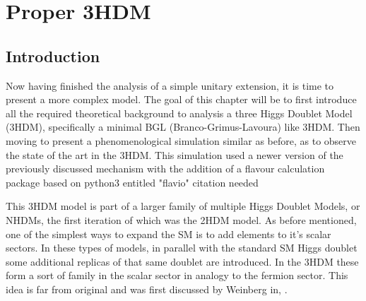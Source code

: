 
\newpage 

\chapter{Proper 3HDM }


%

\section{Introduction}

Now having finished the analysis of a simple unitary extension, it is time to present a more complex model. 
%
The goal of this chapter will be to first introduce all the required theoretical background to analysis a three Higgs Doublet Model (3HDM), specifically a minimal BGL (Branco-Grimus-Lavoura) like 3HDM. 
% 
Then moving to present a phenomenological simulation similar as before, as to observe the state of the art in the 3HDM. 
%
This simulation used a newer version of the previously discussed mechanism with the addition of a flavour calculation package based on python3 entitled "flavio" { \color{blue} citation needed}  

This 3HDM model is part of a larger family of multiple Higgs Doublet Models, or NHDMs, the first iteration of which was the 2HDM model. 
% 
As before mentioned, one of the simplest ways to expand the SM is to add elements to it's scalar sectors. 
%
In these types of models, in parallel with the standard SM Higgs doublet some additional replicas of that same doublet are introduced. 
%
In the 3HDM these form a sort of family in the scalar sector in analogy to the fermion sector. 
%
This idea is far from original and was first discussed by Weinberg in, \cite{Weinberg1976}.

